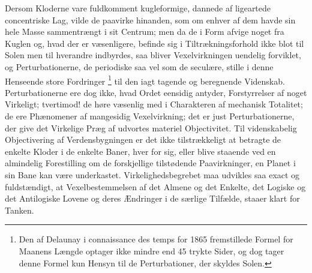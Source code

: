 \documentclass[12pt,a4paper]{book}
\renewcommand{\thefootnote}{*)}
\begin{document}
Dersom Kloderne vare fuldkomment kugleformige, dannede af ligeartede
concentriske Lag, vilde de paavirke hinanden, som om enhver af dem
havde sin hele Masse sammentrængt i sit Centrum; men da de i Form
afvige noget fra Kuglen og, hvad der er væsenligere, befinde sig i
Tiltrækningsforhold ikke blot til Solen men til hverandre indbyrdes,
saa bliver Vexelvirkningen uendelig forviklet, og Perturbationerne,
de periodiske saa vel som de seculære, stille i denne Henseende
store Fordringer%
\renewcommand{\thefootnote}{**)}%
\footnote{%
Den af Delaunay i connaissance des temps for 1865 fremstillede
Formel for Maanens Længde optager ikke mindre end 45 trykte Sider,
og dog tager denne Formel kun Hensyn til de Perturbationer, der
skyldes Solen.}%
\renewcommand{\thefootnote}{*)}
til den iagt\-%
tagende og beregnende Videnskab. Perturbationerne ere dog ikke, hvad
Ordet eensidig antyder, Forstyrrelser af noget Virkeligt; tvertimod!
de høre væsenlig med i Charakteren af mechanisk Totalitet; de ere
Phænomener af mangesidig Vexelvirkning; det er just
Perturbationerne, der give det Virkelige Præg af udvortes materiel
Objectivitet. Til videnskabelig Objectivering af Verdensbygningen er
det ikke tilstrækkeligt at betragte de enkelte Kloder i de enkelte
Baner, hver for sig, eller blive staaende ved en almindelig
Forestilling om de forskjellige tilstødende Paavirkninger, en Planet
i sin Bane kan være underkastet. Virkelighedsbegrebet maa udvikles
saa exact og fuldstændigt, at Vexelbestemmelsen af det Almene og det
Enkelte, det Logiske og det Antilogiske
Lovene og deres Ændringer i de særlige Tilfælde, staaer klart for
Tanken.%
\end{document}
